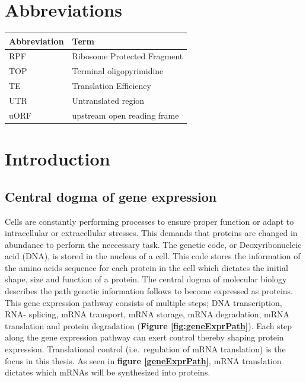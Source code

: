 \documentclass[
  12pt,
  openany]{book}
\author{}
\date{\vspace{-2.5em}}
\begin{document}
{
\setcounter{tocdepth}{3}
\tableofcontents
}
\cleardoublepage
\pagestyle{fancy}
\fancyhf{}
\renewcommand{\headrulewidth}{0pt}
\fancyfoot[LE,RO]{\thepage}
\renewcommand{\floatpagefraction}{.9}

\setcounter{page}{9}

\hypertarget{abbreviations}{%
\chapter*{Abbreviations}\label{abbreviations}}

\begin{tabular}{ll}
\toprule
Abbreviation & Term\\
\midrule
RPF & Ribosome Protected Fragment\\
TOP & Terminal oligopyrimidine\\
TE & Translation Efficiency\\
UTR & Untranslated region\\
uORF & upstream open reading frame\\
\bottomrule
\end{tabular}

\chapter{Introduction}

\section{Central dogma of gene expression}

Cells are constantly performing processes to ensure proper function or adapt to intracellular or extracellular stresses. This demands that proteins are changed in abundance to perform the neccessary task. The genetic code, or Deoxyribonucleic acid (DNA), is stored in the nucleus of a cell. This code stores the information of the amino acids sequence for each protein in the cell which dictates the initial shape, size and function of a protein.
The central dogma of molecular biology describes the path genetic information follows to become expressed as proteins. This gene expression pathway consists of multiple steps; DNA transcription, RNA- splicing, mRNA transport, mRNA storage, mRNA degradation, mRNA translation and protein degradation (\textbf{Figure \ref{fig:geneExprPath}}). Each step along the gene expression pathway can exert control thereby shaping protein expression.
Translational control (i.e.~regulation of mRNA translation) is the focus in this thesis.
As seen in \textbf{figure \ref{geneExprPath}}, mRNA translation dictates which mRNAs will be synthesized into proteins.
\end{document}
